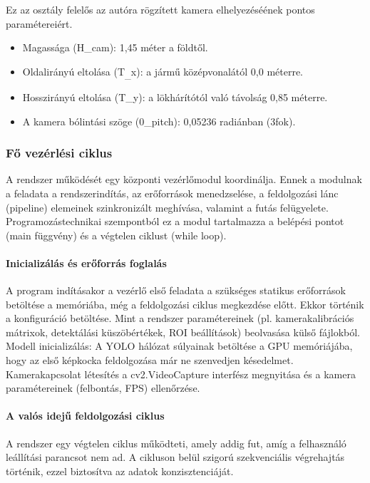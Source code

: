 Ez az osztály felelős az autóra rögzített kamera elhelyezéséének pontos
paramétereiért.

\begin{itemize}
\item
  Magassága (H\_cam): 1,45 méter a földtől.
\item
  Oldalirányú eltolása (T\textsubscript{\_}x): a jármű középvonalától
  0,0 méterre.
\item
  Hosszirányú eltolása (T\_y): a lökhárítótól való távolság 0,85
  méterre.
\item
  A kamera bólintási szöge (0\_pitch): 0,05236 radiánban (3fok).
\end{itemize}

\subsubsection{Fő vezérlési ciklus}

A rendszer működését egy központi vezérlőmodul koordinálja. Ennek a
modulnak a feladata a rendszerindítás, az erőforrások menedzselése, a
feldolgozási lánc (pipeline) elemeinek szinkronizált meghívása, valamint
a futás felügyelete. Programozástechnikai szempontból ez a modul
tartalmazza a belépési pontot (main függvény) és a végtelen ciklust
(while loop).

\paragraph{Inicializálás és erőforrás foglalás}

A program indításakor a vezérlő első feladata a szükséges statikus
erőforrások betöltése a memóriába, még a feldolgozási ciklus megkezdése
előtt. Ekkor történik a konfiguráció betöltése. Mint a rendszer
paramétereinek (pl. kamerakalibrációs mátrixok, detektálási
küszöbértékek, ROI beállítások) beolvasása külső fájlokból. Modell
inicializálás: A YOLO hálózat súlyainak betöltése a GPU memóriájába,
hogy az első képkocka feldolgozása már ne szenvedjen késedelmet.
Kamerakapcsolat létesítés a cv2.VideoCapture interfész megnyitása és a
kamera paramétereinek (felbontás, FPS) ellenőrzése.

\paragraph{A valós idejű feldolgozási ciklus}

A rendszer egy végtelen ciklus működteti, amely addig fut, amíg a
felhasználó leállítási parancsot nem ad. A cikluson belül szigorú
szekvenciális végrehajtás történik, ezzel biztosítva az adatok
konzisztenciáját.

